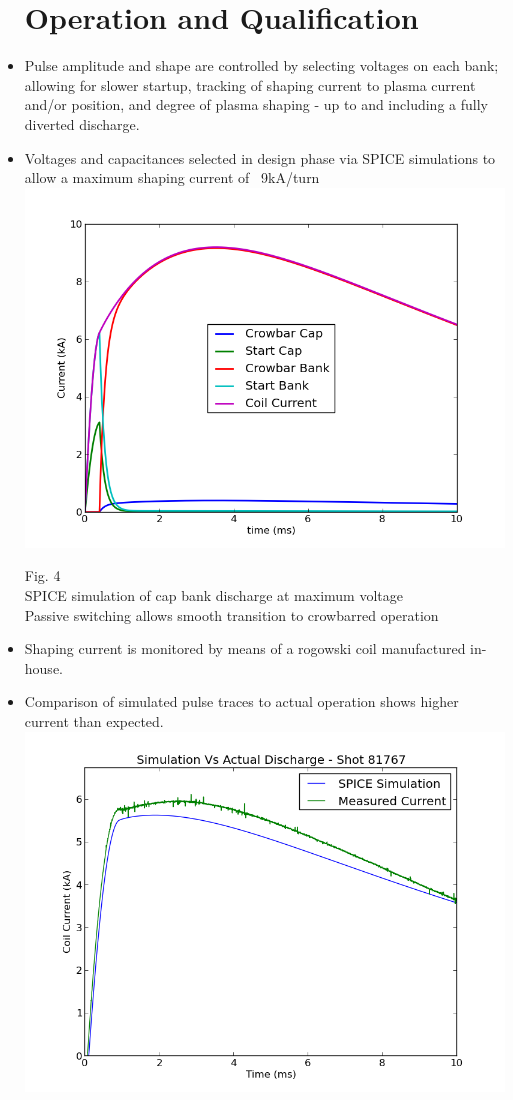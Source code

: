 \documentclass{article}
\begin{document}
\begin{multicols}{5}
\begin{itemize}
\section{Operation and Qualification}
\item Pulse amplitude and shape are controlled by selecting voltages on each bank; allowing for slower startup, tracking of shaping current to plasma current and/or position, and degree of plasma shaping - up to and including a fully diverted discharge.
\item Voltages and capacitances selected in design phase via SPICE simulations to allow a maximum shaping current of ~9kA/turn\\
\vspace{.25in}
\includegraphics[width=0.9\columnwidth]{bank_currents.png}
\begin{center}
Fig. 4\\
SPICE simulation of cap bank discharge at maximum voltage\\
Passive switching allows smooth transition to crowbarred operation\\
\end{center}
\vspace{.25in}
\item Shaping current is monitored by means of a rogowski coil manufactured in-house.
\item Comparison of simulated pulse traces to actual operation shows higher current than expected.
\includegraphics[width=0.9\columnwidth]{shaping_current_sim_vs_real_81797.png}

\end{itemize}
\end{multicols}
\end{document}
